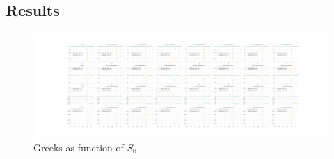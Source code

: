\documentclass{article}
\begin{document}
\subsection{Results}
\begin{figure}
    \centering
        \includegraphics[trim={15cm 5cm 15cm 5cm},width=1.1\paperwidth]{greeks_1}
    \caption{Greeks as function of $S_0$}
    \label{fig:greeks_1}
\end{figure}

\end{document}
